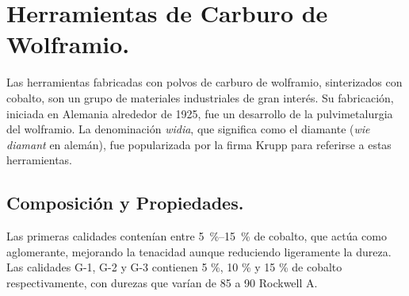 \documentclass[12pt,a4paper]{article}
\begin{document}

\newpage
\tableofcontents

\begin{abstract}
    A partir de la bibliografía listada a continuación, analice e investigue el contenido relacionado con la aleación indicada por la Cátedra a fin de adquirir la capacidad de explicar el significado de la información que allí se detalla. REQUERIMIENTO ADICIONAL: Adicionalmente debe investigar si dichos materiales son de uso actual o ha sido reemplazados por otros más modernos.
    \begin{itemize}
        \item Apraiz Barreiro, J. Aceros Especiales y Otras Aleaciones. Dossat. 5ta Edición. Madrid, 1975. [NOTA: Anualmente la Cátedra asignará los temas a cada equipo de trabajo] \{MM-CAD-0.0.0\}
        \begin{itemize}
            \item Ap. IV Herramientas de carburo de wolframio (pp. 634-639) (1*) [Caso 2025].
        \end{itemize}
    \end{itemize}
\end{abstract}

\section{Herramientas de Carburo de Wolframio.}

Las herramientas fabricadas con polvos de carburo de wolframio, sinterizados con cobalto, son un grupo de materiales industriales de gran interés. Su fabricación, iniciada en Alemania alrededor de 1925, fue un desarrollo de la pulvimetalurgia del wolframio. La denominación \textit{widia}, que significa \textacutedbl{}como el diamante\textacutedbl{} (\textit{wie diamant} en alemán), fue popularizada por la firma Krupp para referirse a estas herramientas.

\subsection{Composición y Propiedades.}

Las primeras calidades contenían entre \SIrange[range-units=single, range-phrase = { y }]{5}{15}{\percent} de cobalto, que actúa como aglomerante, mejorando la tenacidad aunque reduciendo ligeramente la dureza. Las calidades G-1, G-2 y G-3 contienen 5 \%, 10 \% y 15 \% de cobalto respectivamente, con durezas que varían de 85 a 90 Rockwell A.
\end{document}
